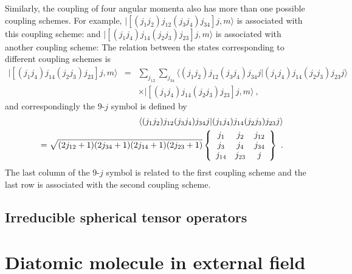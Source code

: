 Similarly, the coupling of four angular momenta also has more than one possible coupling schemes. For example, 
  $|\left[(j_{1}j_{2})j_{12}(j_{3}j_{4})j_{34}\right] j, m \rangle$ is associated with this coupling scheme:
and  $|\left[(j_{1}j_{4})j_{14}(j_{2}j_{3})j_{23}\right] j, m \rangle$ is associated with another coupling scheme:
The relation between the states corresponding to different
coupling schemes is
\begin{eqnarray}
|\left[(j_{1}j_{4})j_{14}(j_{2}j_{3})j_{23}\right] j, m \rangle &=& \sum_{j_{12}}\sum_{j_{34}} \langle (j_{1}j_{2})j_{12}(j_{3}j_{4})j_{34}j  | (j_{1}j_{4})j_{14}(j_{2}j_{3})j_{23}j \rangle \nonumber \\
& & \times |\left[ (j_{1}j_{4})j_{14}(j_{2}j_{3})j_{23}\right] j, m \rangle \ , \label{9-j1}
\end{eqnarray}
and correspondingly the 9-$j$ symbol is defined by
\begin{eqnarray}
&&\langle  (j_{1}j_{2})j_{12}(j_{3}j_{4})j_{34}j  | (j_{1}j_{4})j_{14}(j_{2}j_{3})j_{23}j  \rangle \nonumber \\
& & = \sqrt{(2j_{12} + 1) (2j_{34} +1)(2j_{14}+1)(2j_{23} + 1)}
\left\{
\begin{array}{ccc}
j_{1}& j_{2}&j_{12} \\
j_{3}&j_{4}&j_{34} \\
j_{14}&j_{23}&j 
\end{array}
\right\} \ . \label{9-j2}
\end{eqnarray}
The last column of the 9-$j$ symbol is related to the first coupling scheme and the last row is 
associated with the second coupling scheme.

\subsection{Irreducible spherical tensor operators}



\section{Diatomic molecule in external field}
\label{sec:moleculeInField}

